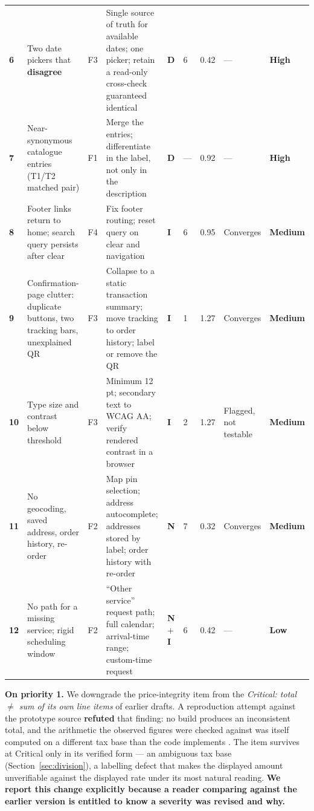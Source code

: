 \documentclass[]{interact}
\theoremstyle{plain}
\begin{document}
{\begin{longtable}{@{}p{} p{} p{} p{} p{} p{} p{} p{} p{}@{}}
\textbf{6} & Two date pickers that \textbf{disagree} & F3 & Single source of truth for available dates; one picker; retain a read-only cross-check guaranteed identical & \textbf{D} & 6 & 0.42 & --- & \textbf{High} \\
\textbf{7} & Near-synonymous catalogue entries (T1/T2 matched pair) & F1 & Merge the entries; differentiate in the label, not only in the description & \textbf{D} & --- & 0.92 & --- & \textbf{High} \\
\textbf{8} & Footer links return to home; search query persists after clear & F4 & Fix footer routing; reset query on clear and navigation & \textbf{I} & 6 & 0.95 & Converges & \textbf{Medium} \\
\textbf{9} & Confirmation-page clutter: duplicate buttons, two tracking bars, unexplained QR & F3 & Collapse to a static transaction summary; move tracking to order history; label or remove the QR & \textbf{I} & 1 & 1.27 & Converges & \textbf{Medium} \\
\textbf{10} & Type size and contrast below threshold & F3 & Minimum 12 pt; secondary text to WCAG AA; verify rendered contrast in a browser & \textbf{I} & 2 & 1.27 & Flagged, not testable & \textbf{Medium} \\
\textbf{11} & No geocoding, saved address, order history, re-order & F2 & Map pin selection; address autocomplete; addresses stored by label; order history with re-order & \textbf{N} & 7 & 0.32 & Converges & \textbf{Medium} \\
\textbf{12} & No path for a missing service; rigid scheduling window & F2 & ``Other service'' request path; full calendar; arrival-time range; custom-time request & \textbf{N} + \textbf{I} & 6 & 0.42 & --- & \textbf{Low} \\
\end{longtable}}

\textbf{On priority 1.} We downgrade the price-integrity item from the \emph{Critical: total $\neq$ sum
of its own line items} of earlier drafts. A reproduction attempt against the prototype source
\textbf{refuted} that finding: no build produces an inconsistent total, and the arithmetic the observed
figures were checked against was itself computed on a different tax base than the code implements
\citep{braniwati2026price}. The item survives at Critical only in its verified form --- an ambiguous
tax base (Section~\ref{sec:division}), a labelling defect that makes the displayed amount
unverifiable against the displayed rate under its most natural reading. \textbf{We report this change
explicitly because a reader comparing against the earlier version is entitled to know a severity was
revised and why.}
\end{document}
